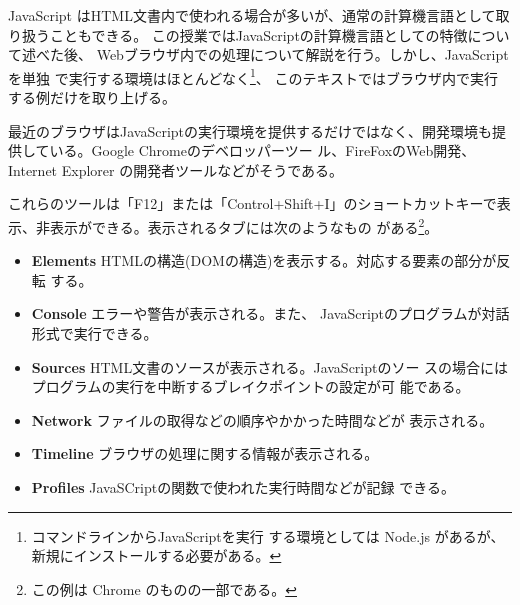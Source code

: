 JavaScript はHTML文書内で使われる場合が多いが、通常の計算機言語として取
り扱うこともできる。
この授業ではJavaScriptの計算機言語としての特徴について述べた後、
Webブラウザ内での処理について解説を行う。しかし、JavaScriptを単独
で実行する環境はほとんどなく\footnote{コマンドラインからJavaScriptを実行
する環境としては Node.js があるが、新規にインストールする必要がある。}、
このテキストではブラウザ内で実行する例だけを取り上げる。

最近のブラウザはJavaScriptの実行環境を提供するだけではなく、開発環境も提
供している。Google Chromeのデベロッパーツー
ル、FireFoxのWeb開発、%
Internet Explorer の開発者ツールなどがそうである。

これらのツールは「F12」または「Control+Shift+I」のショートカットキーで表
示、非表示ができる。表示されるタブには次のようなもの
がある\footnote{この例は Chrome のものの一部である。}。
\begin{itemize}
 \item {\bfseries Elements }
       HTMLの構造(DOMの構造)を表示する。対応する要素の部分が反転
       する。
 \item {\bfseries Console }エラーや警告が表示される。また、
       JavaScriptのプログラムが対話形式で実行できる。
 \item {\bfseries Sources }HTML文書のソースが表示される。JavaScriptのソー
       スの場合にはプログラムの実行を中断するブレイクポイントの設定が可
       能である。
 \item {\bfseries Network }ファイルの取得などの順序やかかった時間などが
       表示される。
 \item {\bfseries Timeline }ブラウザの処理に関する情報が表示される。
 \item {\bfseries Profiles }JavaSCriptの関数で使われた実行時間などが記録
       できる。
\end{itemize}